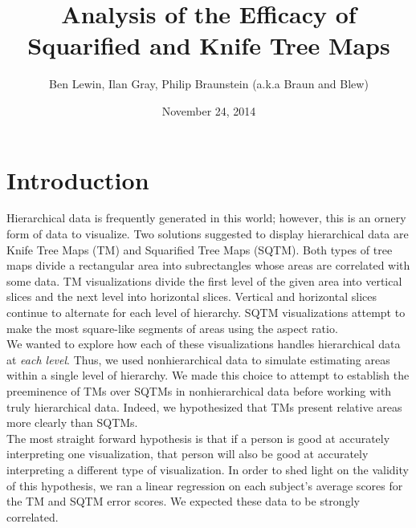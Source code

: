 \documentclass{article}
\title{Analysis of the Efficacy of Squarified and Knife Tree Maps}
\author{Ben Lewin, Ilan Gray, Philip Braunstein (a.k.a Braun and Blew)}
\date{November 24, 2014}
\begin{document}
\maketitle
{}

\section*{Introduction}
Hierarchical data is frequently generated in this world; however, this is an ornery form of data to visualize. Two solutions
suggested to display hierarchical data are Knife Tree Maps (TM) and Squarified Tree Maps (SQTM). Both types of tree maps divide a rectangular area into subrectangles whose areas are correlated with some data. TM visualizations
divide the first level of the given area into vertical slices and the next level into horizontal slices. Vertical and horizontal
slices continue to alternate for each level of hierarchy. SQTM visualizations attempt to make the most square-like segments
of areas using the aspect ratio.\\

We wanted to explore how each of these visualizations handles hierarchical data at \emph{each level}. Thus, we used
nonhierarchical data to simulate estimating areas within a single level of hierarchy. We made this choice to attempt to establish the preeminence  of TMs over SQTMs in nonhierarchical data before working with truly hierarchical data. Indeed, we hypothesized that TMs present relative areas more clearly than SQTMs.\\

The most straight forward hypothesis is that if a person is good at accurately interpreting one visualization, that person will
also be good at accurately interpreting a different type of visualization. In order to shed light on the validity of this hypothesis,
we ran a linear regression on each subject's average scores for the TM and SQTM error scores. We expected these data to be
strongly correlated.
\end{document}
